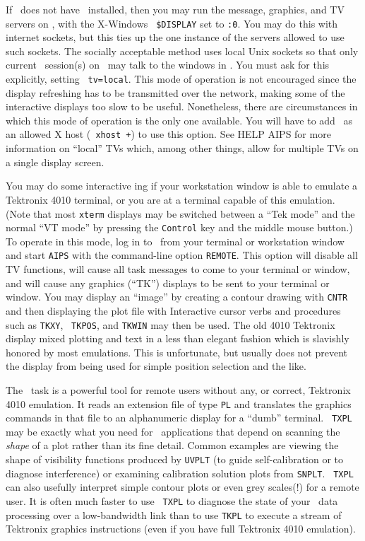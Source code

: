       If \MyH\ does not have \AIPS\ installed, then you may run the
message, graphics, and TV servers on \Ser, with the X-Windows {\tt
\$DISPLAY} set to {\tt \MyH:0}\@.  You may do this with internet
sockets, but this ties up the one instance of the servers allowed to
use such sockets.  The socially acceptable method uses local Unix
sockets so that only current \AIPS\ session(s) on \Ser\ may talk to
the windows in \MyH.  You must ask for this explicitly, setting {\tt
tv=local}.   This mode of operation is not encouraged since the
display refreshing has to be transmitted over the network, making some
of the interactive displays too slow to be useful.  Nonetheless, there
are circumstances in which this mode of operation is the only one
available.  You will have to add \Ser\ as an allowed X host ({\tt
xhost +\Ser}) to use this option.  See {\us HELP AIPS \CR} for more
information on ``local'' TVs which, among other things, allow for
multiple TVs on a single display screen.


     You may do some interactive \Aips ing if your workstation window
is able to emulate a Tektronix 4010 terminal, or you are at a terminal
capable of this emulation.  (Note that most {\tt xterm} displays may be
switched between a ``Tek mode'' and the normal ``VT mode'' by pressing
the {\tt Control} key and the middle mouse button.)  To operate in
this mode, log in to \Ser\ from your terminal or workstation window
and start {\tt AIPS} with the command-line option {\tt REMOTE}\@.
This option will disable all TV functions, will cause all task
messages to come to your terminal or window, and will cause any
graphics (``TK'') displays to be sent to your terminal or window.  You
may display an ``image'' by creating a contour drawing with {\tt CNTR}
and then displaying the plot file with {\tt {}}\@
Interactive cursor verbs and procedures such as {\tt TKXY}, {\tt
TKPOS}, and {\tt TKWIN} may then be used.  The old 4010 Tektronix
display mixed plotting and text in a less than elegant fashion which
is slavishly honored by most emulations.  This is unfortunate, but
usually does not prevent the display from being used for simple
position selection and the like.

     The \AIPS\ task {\tt {}} is a powerful tool for remote
users without any, or correct, Tektronix 4010 emulation.   It reads an
extension file of type {\tt PL} and translates the graphics commands
in that file to an alphanumeric display for a ``dumb'' terminal.  {\tt
TXPL} may be exactly what you need for \AIPS\ applications that depend
on scanning the {\it shape\/} of a plot rather than its fine detail.
Common examples are viewing the shape of visibility functions produced
by {\tt UVPLT} (to guide self-calibration or to diagnose interference)
or examining calibration solution plots from \hbox{{\tt SNPLT}}. {\tt
TXPL} can also usefully interpret simple contour plots or even grey
scales(!) for a remote user.  It is often much faster to use {\tt
TXPL} to diagnose the state of your \AIPS\ data processing over a
low-bandwidth link than to use {\tt TKPL} to execute a stream of
Tektronix graphics instructions (even if you have full Tektronix 4010
emulation).

